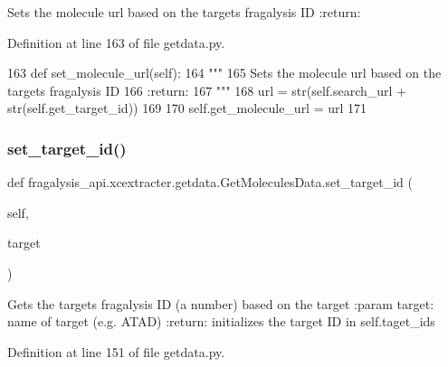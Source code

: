 \begin{DoxyVerb}Sets the molecule url based on the targets fragalysis ID
:return:
\end{DoxyVerb}
 

Definition at line 163 of file getdata.\+py.


\begin{DoxyCode}
163     \textcolor{keyword}{def }set\_molecule\_url(self):
164         \textcolor{stringliteral}{"""}
165 \textcolor{stringliteral}{        Sets the molecule url based on the targets fragalysis ID}
166 \textcolor{stringliteral}{        :return:}
167 \textcolor{stringliteral}{        """}
168         url = str(self.search\_url + str(self.get\_target\_id))
169 
170         self.get\_molecule\_url = url
171 
\end{DoxyCode}
\mbox{\label{classfragalysis__api_1_1xcextracter_1_1getdata_1_1_get_molecules_data_acc782fb40405a434903f6d3e80624c9c}} 
\subsubsection{\texorpdfstring{set\+\_\+target\+\_\+id()}{set\_target\_id()}}
{\footnotesize\ttfamily def fragalysis\+\_\+api.\+xcextracter.\+getdata.\+Get\+Molecules\+Data.\+set\+\_\+target\+\_\+id (\begin{DoxyParamCaption}\item[{}]{self,  }\item[{}]{target }\end{DoxyParamCaption})}

\begin{DoxyVerb}Gets the targets fragalysis ID (a number) based on the target
:param target: name of target (e.g. ATAD)
:return: initializes the target ID in self.taget_ids
\end{DoxyVerb}
 

Definition at line 151 of file getdata.\+py.


